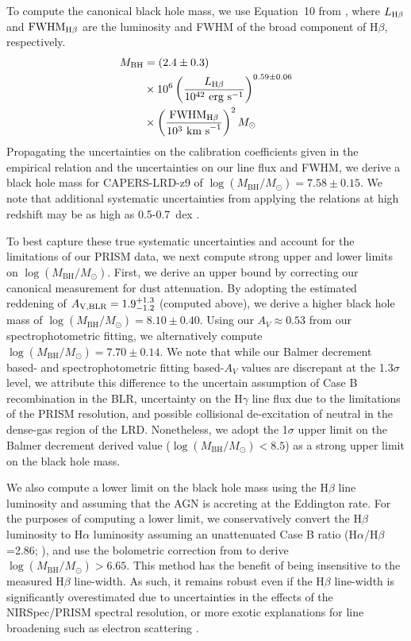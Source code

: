 \documentclass[twocolumn]{aastex7}
\newcommand{\src}{CAPERS-LRD-z9}
\begin{document}
To compute the canonical black hole mass, we use Equation~10 from \cite{greene05}, where $L_{{\rm H}\beta}$ and $\textrm{FWHM}_{{\rm H}\beta}$ are the luminosity and FWHM of the broad component of H$\beta$, respectively. 
\begin{equation} \label{eq:bhmass}
\begin{aligned} 
M_{\textrm{BH}}&=(2.4\pm0.3) \\ & \times 10^6\left(\frac{L_{{\rm H}\beta}}{10^{42}\textrm{ erg s}^{-1}}\right)^{0.59\pm0.06} \\ & \times \left(\frac{\textrm{FWHM}_{{\rm H}\beta}}{10^3\textrm{ km s}^{-1}}\right)^{2}M_{\odot} 
\end{aligned}
\end{equation}
Propagating the uncertainties on the calibration coefficients given in the empirical relation and the uncertainties on our line flux and FWHM, we derive a black hole mass for \src{} of $\log(M_{\textrm{BH}}/M_{\odot})=7.58\pm0.15$. We note that additional systematic uncertainties from applying the \cite{greene05} relations at high redshift may be as high as 0.5-0.7~dex \citep{FonsecaAlvarez2020,abuter24}.

To best capture these true systematic uncertainties and account for the limitations of our PRISM data, we next compute strong upper and lower limits on $\log(M_{\textrm{BH}}/M_{\odot})$.
First, we derive an upper bound by correcting our canonical measurement for dust attenuation. By adopting the estimated reddening of $A_{\rm V,BLR}=1.9^{+1.3}_{-1.2}$ (computed above), we derive a higher black hole mass of $\log(M_{\textrm{BH}}/M_{\odot})=8.10\pm0.40$. Using our $A_V\approx0.53$ from our spectrophotometric fitting, we alternatively compute $\log(M_{\textrm{BH}}/M_{\odot})=7.70\pm0.14$. We note that while our Balmer decrement based- and spectrophotometric fitting based-$A_V$ values are discrepant at the 1.3$\sigma$ level, we attribute this difference to the uncertain assumption of Case B recombination in the BLR, uncertainty on the H$\gamma$ line flux due to the limitations of the PRISM resolution, and possible collisional de-excitation of neutral in the dense-gas region of the LRD. Nonetheless, we adopt the 1$\sigma$ upper limit on the Balmer decrement derived value ($\log(M_{\textrm{BH}}/M_{\odot})<8.5$) as a strong upper limit on the black hole mass.

We also compute a lower limit on the black hole mass using the H$\beta$ line luminosity and assuming that the AGN is accreting at the Eddington rate. For the purposes of computing a lower limit, we conservatively convert the H$\beta$ luminosity to H$\alpha$ luminosity assuming an unattenuated Case B ratio (H$\alpha$/H$\beta$=2.86; \citealt{osterbrock89}), and use the bolometric correction from \cite{stern12} to derive $\log(M_{\textrm{BH}}/M_{\odot})>6.65$. This method has the benefit of being insensitive to the measured H$\beta$ line-width. As such, it remains robust even if the H$\beta$ line-width is significantly overestimated due to uncertainties in the effects of the NIRSpec/PRISM spectral resolution, or more exotic explanations for line broadening such as electron scattering \citep[e.g.,][]{rusakov25}. 
\end{document}
